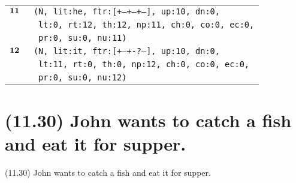 \documentclass{article}
\begin{document}
\begin{minipage}{\textwidth}
{\begin{tabular}{|r|l|}
    ${\textbf{\textrm{11}}_{\phantom{z}}}$ & \texttt{\texttt{(N,~lit:he,~ftr:[+--+--+--],~up:10,~dn:0,}} \\
    & \texttt{\texttt{~lt:0,~rt:12,~th:12,~np:11,~ch:0,~co:0,~ec:0,}} \\
    & \texttt{\texttt{~pr:0,~su:0,~nu:11)}} \\
    ${\textbf{\textrm{12}}_{\phantom{z}}}$ & \texttt{\texttt{(N,~lit:it,~ftr:[+--+-?---],~up:10,~dn:0,}} \\
    & \texttt{\texttt{~lt:11,~rt:0,~th:0,~np:12,~ch:0,~co:0,~ec:0,}} \\
    & \texttt{\texttt{~pr:0,~su:0,~nu:12)}} \\
    \hline
  \end{tabular}
  }
\end{minipage}
\bigbreak

\clearpage

%
%

\section*{(11.30) John wants to catch a fish and eat it for supper.}

\bigbreak
\begin{enumerate*}
\item[(11.30)] John wants to catch a fish and eat it for supper.
\end{enumerate*}
\bigbreak
\end{document}
